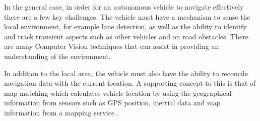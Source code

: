 \documentclass[]{aiaa-tc}%
\begin{document}
In the general case, in order for an autonomous vehicle to navigate effectively there are a few key challenges. The vehicle must have a mechanism to sense the local environment, for example lane detection, as well as the ability to identify and track transient aspects such as other vehicles and on road obstacles. There are many Computer Vision techniques that can assist in providing an understanding of the environment. 

In addition to the local area, the vehicle must also have the ability to reconcile navigation data with the current location. A supporting concept to this is that of map matching which calculates vehicle location by using the geographical information from sensors such as GPS position, inertial data and map information from a mapping service \citep{keyTechSelfDriving}. 
\end{document}

